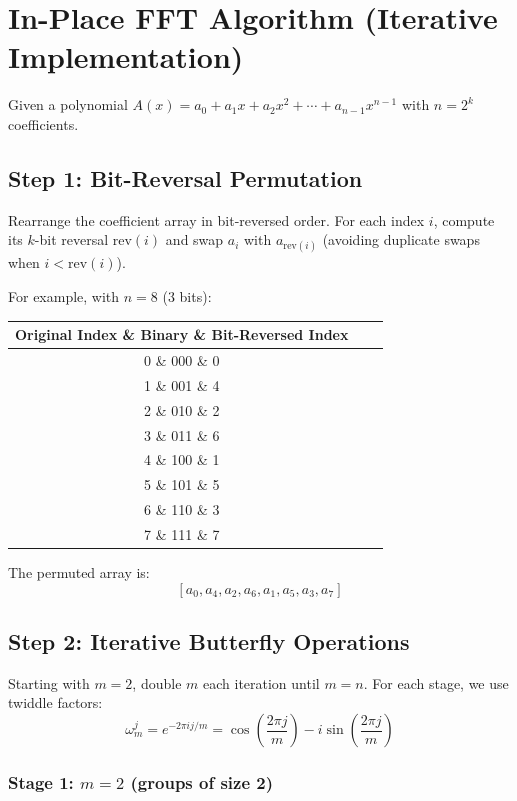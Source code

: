 \documentclass{article}
\begin{document}
\section*{In-Place FFT Algorithm (Iterative Implementation)}

Given a polynomial $A(x) = a_0 + a_1x + a_2x^2 + \cdots + a_{n-1}x^{n-1}$ with $n = 2^k$ coefficients.

\subsection*{Step 1: Bit-Reversal Permutation}

Rearrange the coefficient array in bit-reversed order. For each index $i$, compute its $k$-bit reversal $\text{rev}(i)$ and swap $a_i$ with $a_{\text{rev}(i)}$ (avoiding duplicate swaps when $i < \text{rev}(i)$).

For example, with $n=8$ (3 bits):
\begin{center}
\begin{tabular}{c|c|c}
Original Index \& Binary \& Bit-Reversed Index \\
\hline
0 \& 000 \& 0 \\
1 \& 001 \& 4 \\
2 \& 010 \& 2 \\
3 \& 011 \& 6 \\
4 \& 100 \& 1 \\
5 \& 101 \& 5 \\
6 \& 110 \& 3 \\
7 \& 111 \& 7 \\
\end{tabular}
\end{center}

The permuted array is:
$$[a_0, a_4, a_2, a_6, a_1, a_5, a_3, a_7]$$

\subsection*{Step 2: Iterative Butterfly Operations}

Starting with $m=2$, double $m$ each iteration until $m=n$. For each stage, we use twiddle factors:
$$\omega_m^j = e^{-2\pi i j / m} = \cos\left(\frac{2\pi j}{m}\right) - i\sin\left(\frac{2\pi j}{m}\right)$$

\subsubsection*{Stage 1: $m=2$ (groups of size 2)}
\end{document}
